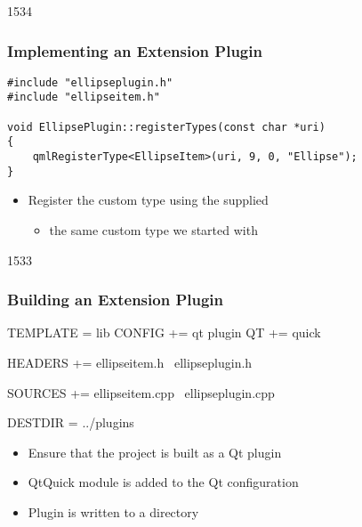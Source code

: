 \begin{slide}[fragile]{1534}\frametitle{Implementing an Extension Plugin}

\begin{lstlisting}
#include "ellipseplugin.h"
#include "ellipseitem.h"

void EllipsePlugin::registerTypes(const char *uri)
{
    qmlRegisterType<EllipseItem>(uri, 9, 0, "Ellipse");
}

\end{lstlisting}

\vspace*{0.5em}
\begin{itemize}
\item Register the custom type using the  supplied
  \begin{itemize}
  \item the same custom type we started with
  \end{itemize}
\end{itemize}

\end{slide}

\begin{slide}[fragile]{1533}\frametitle{Building an Extension Plugin}

\begin{qmake}
TEMPLATE  = lib
CONFIG   += qt plugin
QT       += quick

HEADERS  += ellipseitem.h \
            ellipseplugin.h

SOURCES  += ellipseitem.cpp \
            ellipseplugin.cpp

DESTDIR   = ../plugins
\end{qmake}

\vspace*{0.5em}
\begin{itemize}
\item Ensure that the project is built as a Qt plugin
\item QtQuick module is added to the Qt configuration
\item Plugin is written to a \qtt{plugins} directory
\end{itemize}

\end{slide}

